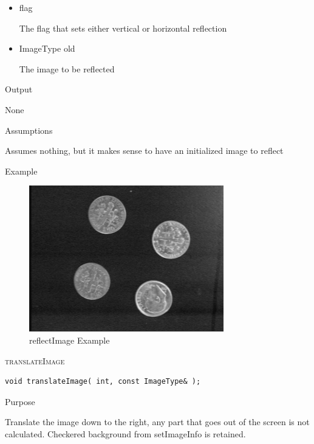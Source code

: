 \documentclass[pdftex, 11pt]{article}
\begin{document}
\begin{description}
\begin{description}
				\begin{itemize}

					\item{flag}

						The flag that sets either vertical or
						horizontal reflection

					\item{ImageType old}

						The image to be reflected

				\end{itemize}

			\item{Output}

				None

			\item{Assumptions}

				Assumes nothing, but it makes sense to have an initialized
				image to reflect

			\item{Example}

				\begin{figure}[p]
					\centering
					\caption{reflectImage Example}
				\includegraphics{images/outreflect.png}
			\end{figure}

		\end{description}


	\item{\textsc{translateImage}}
		\begin{description}

\begin{lstlisting}
void translateImage( int, const ImageType& );
\end{lstlisting}

			\item{Purpose}

				Translate the image down to the right,
				any part that goes out of the screen is
 				not calculated.  Checkered background from
				setImageInfo is retained.


\end{description}
\end{description}
\end{document}
